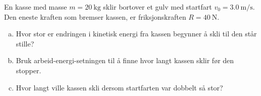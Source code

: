 %
En kasse med masse $m = \SI{20}{\kilo\gram}$ sklir bortover et gulv med startfart $v_0 = \SI{3.0}{\metre\per\second}$. Den eneste kraften som bremser kassen, er friksjonskraften $R = \SI{40}{\newton}$.
\begin{enumerate}[a)]
    \item Hvor stor er endringen i kinetisk energi fra kassen begynner å skli til den står stille?
    \item Bruk arbeid-energi-setningen til å finne hvor langt kassen sklir før den stopper.
    \item Hvor langt ville kassen skli dersom startfarten var dobbelt så stor?
\end{enumerate}
